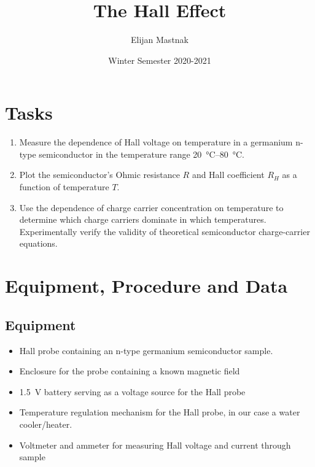 \documentclass[11pt, a4paper]{article}
\begin{document}
\title{The Hall Effect}
\author{Elijan Mastnak}
\date{Winter Semester 2020-2021}
\maketitle
\tableofcontents
	
\section{Tasks}
\begin{enumerate}
	\item Measure the dependence of Hall voltage on temperature in a germanium n-type semiconductor in the temperature range \SIrange{20}{80}{\degreeCelsius}. 
	
	\item Plot the semiconductor's Ohmic resistance $ R $ and Hall coefficient $ R_{H} $ as a function of temperature $ T $.
	
	\item Use the dependence of charge carrier concentration on temperature to determine which charge carriers dominate in which temperatures. Experimentally verify the validity of theoretical semiconductor charge-carrier equations. 

\end{enumerate}

\section{Equipment, Procedure and Data}

\subsection{Equipment}
\begin{itemize}

	\item Hall probe containing an n-type germanium semiconductor sample.
	
	\item Enclosure for the probe containing a known magnetic field
		
	\item \SI{1.5}{\volt} battery serving as a voltage source for the Hall probe
	
	\item Temperature regulation mechanism for the Hall probe, in our case a water cooler/heater.
	
	\item Voltmeter and ammeter for measuring Hall voltage and current through sample
\end{itemize}
\end{document}
